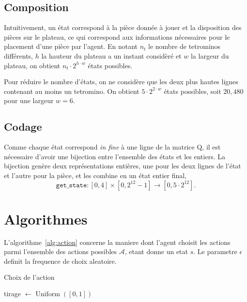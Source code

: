 \documentclass{report}
\DeclareMathOperator{\argmax}{argmax}
\DeclareMathOperator{\uniform}{Uniform}
\begin{document}
\subsection{Composition}
Intuitivement, un état correspond à la pièce donnée à jouer et la disposition
des pièces sur le plateau, ce qui correspond aux informations nécessaires pour
le placement d'une pièce par l'agent. En notant \(n_t\) le nombre de tetrominos
différents, \( h \) la hauteur du plateau a un instant considèré  et \(w\) la
largeur du plateau, on obtient \(n_t \cdot 2^{h \cdot w}\) états possibles.

Pour réduire le nombre d'états, on ne considère que les deux plus hautes lignes
contenant au moins un tetromino. On obtient \(5\cdot 2^{2 \cdot w}\) états
possibles, soit \(20,480\) pour une largeur \( w = 6 \).

\subsection{Codage}
Comme chaque état correspond \textit{in fine} à une ligne de la matrice Q, il est
nécessaire d'avoir une bijection entre l'ensemble des états et les entiers. La
bijection genère deux représentations entières, une pour les deux lignes de
l'état et l'autre pour la pièce, et les combine en un état entier final,
\[
  \texttt{get\_state}\colon [0,4]\times [0, 2^{12} - 1] \to [0, 5\cdot 2^{12}].
\]


\section{Algorithmes}

L'algorithme~\ref{alg:action} concerne la maniere dont l'agent choisit les
actions parmi l'ensemble des actions possibles \(\mathcal{A}\), etant donne un
etat \(s\). Le parametre \(\epsilon\) definit la frequence de choix aleatoire.
\begin{algorithm}
  \caption{Choix de l'action}\label{alg:action}
  \begin{algorithmic}
    [1]
    \State{} tirage \(\gets \uniform([0, 1])\)
    \Return{\(\argmax_{a\in\mathcal{A}} Q(s, a)\)}
    \Else{}
    \Return{\(\uniform(\mathcal{A})\)}
    \EndIf{}
    \EndProcedure{}
  \end{algorithmic}
\end{algorithm}
\end{document}
